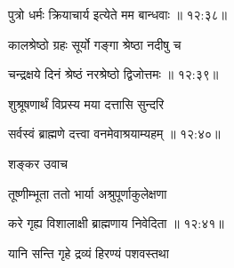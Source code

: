 
{\devanagarifont पुत्रो धर्मः क्रियाचार्य इत्येते मम बान्धवाः {॥ १२:३८॥} \veg\dontdisplaylinenum }%
 
{\devanagarifont कालश्रेष्ठो ग्रहः सूर्यो गङ्गा श्रेष्ठा नदीषु च \thinspace{\dandab} \dontdisplaylinenum }%


{\devanagarifont चन्द्रक्षये दिनं श्रेष्ठं नरश्रेष्ठो द्विजोत्तमः {॥ १२:३९॥} \veg\dontdisplaylinenum }%

{\devanagarifont शुश्रूषणार्थं विप्रस्य मया दत्तासि सुन्दरि \thinspace{\dandab} \dontdisplaylinenum }%


{\devanagarifont सर्वस्वं ब्राह्मणे दत्त्वा वनमेवाश्रयाम्यहम् {॥ १२:४०॥} \veg\dontdisplaylinenum }%
 
{\devanagarifont शङ्कर उवाच {\dandab}\dontdisplaylinenum  }%

{\devanagarifont तूष्णीम्भूता ततो भार्या अश्रुपूर्णाकुलेक्षणा \thinspace{\danda} \dontdisplaylinenum }%


{\devanagarifont करे गृह्य विशालाक्षी ब्राह्मणाय निवेदिता {॥ १२:४१॥} \veg\dontdisplaylinenum }%

{\devanagarifont यानि सन्ति गृहे द्रव्यं हिरण्यं पशवस्तथा \thinspace{\dandab} \dontdisplaylinenum }%

